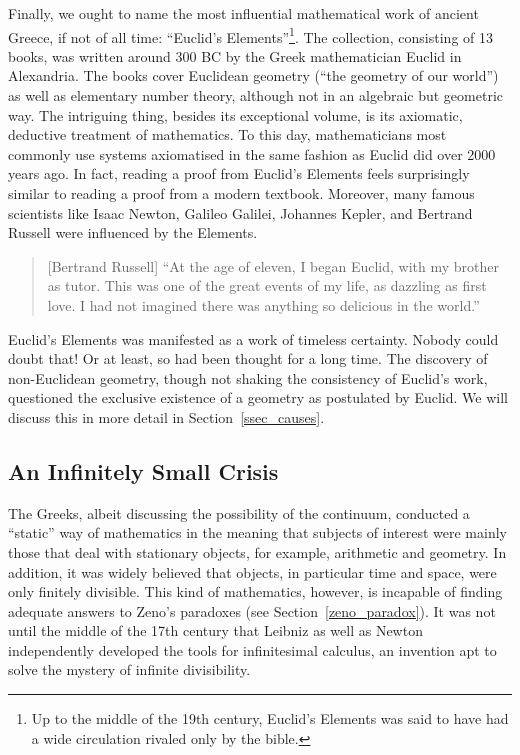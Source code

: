 \documentclass{article}
\begin{document}
Finally, we ought to name the most influential mathematical work of ancient Greece, if not of all time: ``Euclid's Elements''\footnote{Up to the middle of the 19th century, Euclid's Elements was said to have had a wide circulation rivaled only by the bible.}. 
The collection, consisting of 13 books, was written around 300 BC by the Greek mathematician Euclid in Alexandria. The books cover Euclidean geometry (``the geometry of our world'') as well as elementary number theory, although not in an algebraic but geometric way. The intriguing thing, besides its exceptional volume, is its axiomatic, deductive treatment of mathematics. To this day, mathematicians most commonly use systems axiomatised in the same fashion as Euclid did over 2000 years ago. In fact, reading a proof from Euclid's Elements feels surprisingly similar to reading a proof from a modern textbook. Moreover, many famous scientists like Isaac Newton, Galileo Galilei, Johannes Kepler, and Bertrand Russell were influenced by the Elements.
\begin{quote}[Bertrand Russell]
	``At the age of eleven, I began Euclid, with my brother as tutor. This was one of the great events of my life, as dazzling as first love. I had not imagined there was anything so delicious in the world.''\cite{russell_autobiography}
\end{quote}
Euclid's Elements was manifested as a work of timeless certainty. Nobody could doubt that! Or at least, so had been thought for a long time. The discovery of non-Euclidean geometry, though not shaking the consistency of Euclid's work, questioned the exclusive existence of a geometry as postulated by Euclid. We will discuss this in more detail in Section~\ref{ssec_causes}.

\subsection{An Infinitely Small Crisis}
The Greeks, albeit discussing the possibility of the continuum, conducted a ``static'' way of mathematics in the meaning that subjects of interest were mainly those that deal with stationary objects, for example, arithmetic and geometry. In addition, it was widely believed that objects, in particular time and space, were only finitely divisible. This kind of mathematics, however, is incapable of finding adequate answers to Zeno's paradoxes (see Section~\ref{zeno_paradox}).
It was not until the middle of the 17th century that Leibniz as well as Newton independently developed the tools for infinitesimal calculus, an invention apt to solve the mystery of infinite divisibility.
\end{document}
